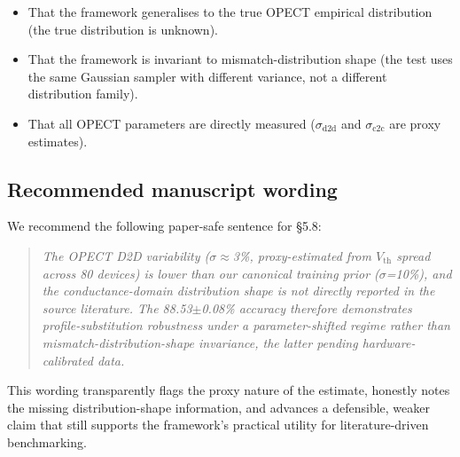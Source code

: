 \begin{itemize}
\item That the framework generalises to the true OPECT empirical distribution (the true distribution is unknown).
\item That the framework is invariant to mismatch-distribution shape (the test uses the same Gaussian sampler with different variance, not a different distribution family).
\item That all OPECT parameters are directly measured ($\sigma_{\text{d2d}}$ and $\sigma_{\text{c2c}}$ are proxy estimates).
\end{itemize}

\subsection{Recommended manuscript wording}

We recommend the following paper-safe sentence for \S5.8:

\begin{quote}
\textit{The OPECT D2D variability ($\sigma\approx$3\%, proxy-estimated from $V_{\text{th}}$ spread across 80 devices) is lower than our canonical training prior ($\sigma$=10\%), and the conductance-domain distribution shape is not directly reported in the source literature. The 88.53$\pm$0.08\% accuracy therefore demonstrates profile-substitution robustness under a parameter-shifted regime rather than mismatch-distribution-shape invariance, the latter pending hardware-calibrated data.}
\end{quote}

This wording transparently flags the proxy nature of the estimate, honestly notes the missing distribution-shape information, and advances a defensible, weaker claim that still supports the framework's practical utility for literature-driven benchmarking.
